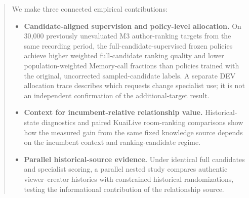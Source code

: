 \begin{abstract}
We make three connected empirical contributions:
\begin{itemize}
    \item \textbf{Candidate-aligned supervision and policy-level allocation.} On 30,000 previously unevaluated M3 author-ranking targets from the same recording period, the full-candidate-supervised frozen policies achieve higher weighted full-candidate ranking quality and lower population-weighted Memory-call fractions than policies trained with the original, uncorrected sampled-candidate labels. A separate DEV allocation trace describes which requests change specialist use; it is not an independent confirmation of the additional-target result.
    \item \textbf{Context for incumbent-relative relationship value.} Historical-state diagnostics and paired KuaiLive room-ranking comparisons show how the measured gain from the same fixed knowledge source depends on the incumbent context and ranking-candidate regime.
    \item \textbf{Parallel historical-source evidence.} Under identical full candidates and specialist scoring, a parallel nested study compares authentic viewer--creator histories with constrained historical randomizations, testing the informational contribution of the relationship source.
\end{itemize}


\end{abstract}
